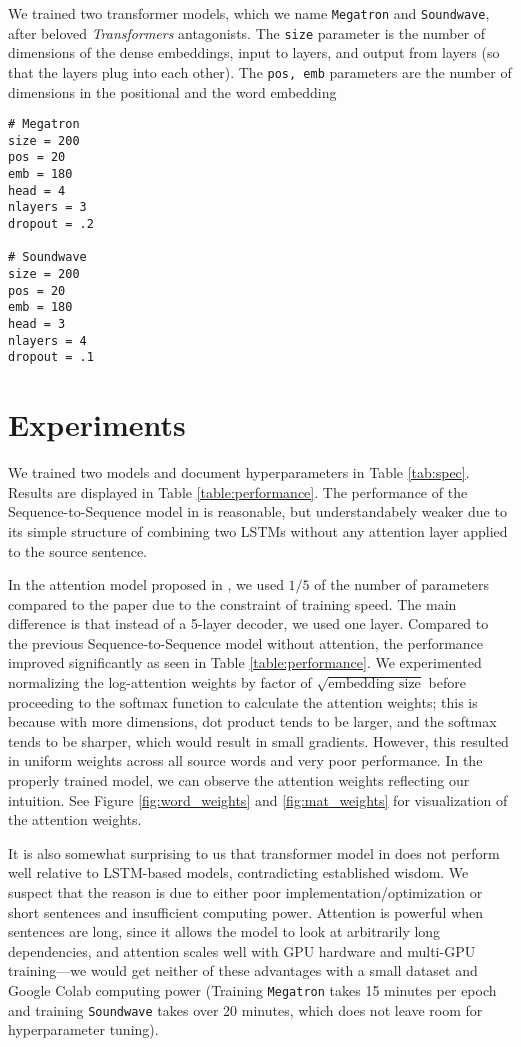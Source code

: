 \documentclass[12pt]{article}
\begin{document}
We trained two transformer models, which we name \texttt{Megatron} and 
\texttt{Soundwave}, after beloved \emph{Transformers} antagonists. The 
\texttt{size} parameter is the number of dimensions of the dense embeddings,
input to layers, and output from layers (so that the layers plug into each
other). The \texttt{pos, emb} parameters are the number of dimensions in the
positional and the word embedding 

\begin{verbatim}
# Megatron
size = 200
pos = 20
emb = 180
head = 4
nlayers = 3
dropout = .2

# Soundwave
size = 200
pos = 20
emb = 180
head = 3
nlayers = 4
dropout = .1
\end{verbatim}

\section{Experiments}
We trained two models and document hyperparameters in Table \ref{tab:spec}. Results are displayed in Table \ref{table:performance}. The performance of the Sequence-to-Sequence model in \cite{sutskever2014sequence} is reasonable, but understandabely weaker due to its simple structure of combining two LSTMs without any attention layer applied to the source sentence.

In the attention model proposed in \cite{bahdanau2014neural}, we used $1/5$ of
the number of parameters compared to the paper due to the constraint of training
speed. The main difference is that instead of a 5-layer decoder, we used one
layer. Compared to the previous Sequence-to-Sequence model without attention,
the performance improved significantly as seen in Table \ref{table:performance}.
We experimented normalizing the log-attention weights by factor of $\sqrt{
\textrm{embedding size}}$ before proceeding to the softmax function to calculate
the attention weights; this is because with more dimensions, dot product tends
to be larger, and the softmax tends to be sharper, which would result in small
gradients. However, this resulted in uniform weights across all source words and
very poor performance. In the properly trained model, we can observe the attention weights reflecting our intuition. See Figure \ref{fig:word_weights} and \ref{fig:mat_weights} for visualization of the attention weights.

It is also somewhat surprising to us that transformer model in 
\cite{vaswani2017attention} does not perform well relative to LSTM-based models,
contradicting established wisdom. We suspect that the reason is due to either
poor implementation/optimization or short sentences and insufficient computing
power. Attention is powerful when sentences are long, since it allows the model
to look at arbitrarily long dependencies, and attention scales well with GPU
hardware and multi-GPU training---we would get neither of these advantages with
a small dataset and
Google Colab computing power (Training \texttt{Megatron} takes 15 minutes per
epoch and training \texttt{Soundwave} takes over 20 minutes, which does not
leave room for hyperparameter tuning).
\end{document}
